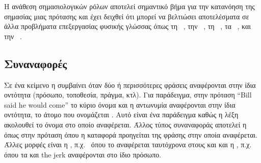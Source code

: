 Η ανάθεση σημασιολογικών ρόλων αποτελεί σημαντικό βήμα για την κατανόηση της σημασίας μιας πρότασης και έχει δειχθεί ότι μπορεί να βελτιώσει αποτελέσματα σε άλλα προβλήματα επεξεργασίας φυσικής γλώσσας
όπως τη ~\cite{berant2014modeling,wang2015machine},
την ~\cite{narayanan2004question,weston2015towards,yih2016value},
τη ~\cite{wu2009semantic,liu2010semantic,gao2011utilizing,bazrafshan2013semantic},
τα ~\cite{tur2005semi,chen2013unsupervised},
και την ~\cite{surdeanu2003using,exner2011using,rospocher2016building}.

\subsection{Συναναφορές}\label{subsec:coref}
Σε ένα κείμενο η  συμβαίνει όταν δύο ή περισσότερες φράσεις αναφέρονται στην ίδια οντότητα (πρόσωπο, τοποθεσία, πράγμα, κτλ).
Για παράδειγμα, στην πρόταση \enquote{Bill said he would come} το κύριο όνομα  και η αντωνυμία  αναφέρονται στην ίδια οντότητα, το άτομο που ονομάζεται .
Αυτό είναι ένα παράδειγμα  καθώς η λέξη  ακολουθεί το όνομα στο οποίο αναφέρεται.
Άλλος τύπος συναναφοράς αποτελεί η  όπως στην πρόταση  όπου η καταφορά  προηγείται της φράσης  στην οποία αναφέρεται.
Άλλες μορφές είναι η , π.χ.\  όπου το  αναφέρεται ταυτόχρονα στους  και 
και η , π.χ.\  όπου τα  και {the jerk} αναφέρονται στο ίδιο πρόσωπο.

